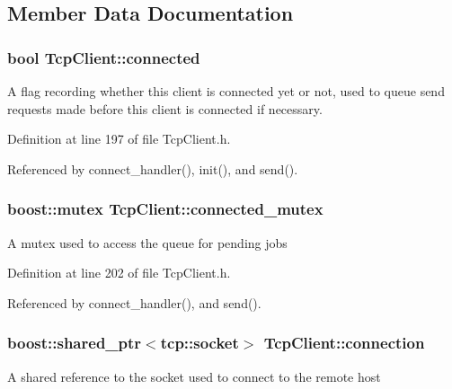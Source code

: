 \subsection{Member Data Documentation}
\hypertarget{classTcpClient_aaceab0b8199fff1898b9c9301748733d}{
\subsubsection[{connected}]{\setlength{\rightskip}{0pt plus 5cm}bool {\bf TcpClient::connected}}}
\label{classTcpClient_aaceab0b8199fff1898b9c9301748733d}
A flag recording whether this client is connected yet or not, used to queue send requests made before this client is connected if necessary. 

Definition at line 197 of file TcpClient.h.



Referenced by connect\_\-handler(), init(), and send().

\hypertarget{classTcpClient_a96d0c8fe68ec52f42a1d287356027adb}{
\subsubsection[{connected\_\-mutex}]{\setlength{\rightskip}{0pt plus 5cm}boost::mutex {\bf TcpClient::connected\_\-mutex}}}
\label{classTcpClient_a96d0c8fe68ec52f42a1d287356027adb}
A mutex used to access the queue for pending jobs 

Definition at line 202 of file TcpClient.h.



Referenced by connect\_\-handler(), and send().

\hypertarget{classTcpClient_add183a7de092c7c13ae6ab90766c9881}{
\subsubsection[{connection}]{\setlength{\rightskip}{0pt plus 5cm}boost::shared\_\-ptr$<$tcp::socket$>$ {\bf TcpClient::connection}}}
\label{classTcpClient_add183a7de092c7c13ae6ab90766c9881}
A shared reference to the socket used to connect to the remote host 

